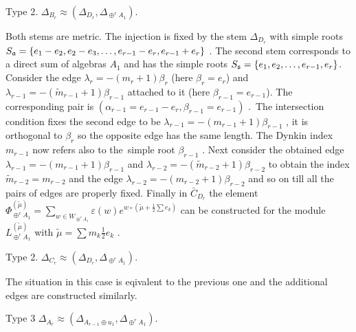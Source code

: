 \documentclass[12pt]{article}
\begin{document}
Type 2. $\Delta _{B_{r}}\approx (\Delta _{D_{r}},\Delta _{\oplus
^{r}A_{1}}). $

Both stems are metric. The injection is fixed by the stem $\Delta
_{D_{r}}$ with simple roots $S_{\frak{a}}=\left\{
e_{1}-e_{2},e_{2}-e_{3},\ldots
,e_{r-1}-e_{r},e_{r-1}+e_{r}\right\} $ . The second stem
corresponds to a
direct sum of algebras $A_{1}$ and has the simple roots $S_{\frak{s}%
}=\left\{ e_{1},e_{2},\ldots ,e_{r-1},e_{r}\right\} $. Consider the edge $%
\lambda _{r}=-\left( m_{r}+1\right) \beta _{r}$ (here $\beta
_{r}=e_{r}$) and $\lambda _{r-1}=-\left(
\widetilde{m}_{r-1}+1\right) \beta _{r-1}$
attached to it (here $\beta _{r-1}=e_{r-1}$). The corresponding pair is $%
\left( \alpha _{r-1}=e_{r-1}-e_{r},\beta _{r-1}=e_{r-1}\right) $
.\ The intersection condition fixes the second edge to be $\lambda
_{r-1}=-\left( m_{r-1}+1\right) \beta _{r-1}$ , it is orthogonal
to $\beta _{r}$ so the opposite edge has the same length. The
Dynkin index $m_{r-1}$ now refers
also to the\ simple root $\beta _{r-1}$ . Next consider the obtained edge $%
\lambda _{r-1}=-\left( m_{r-1}+1\right) \beta _{r-1}$ and $\lambda
_{r-2}=-\left( \widetilde{m}_{r-2}+1\right) \beta _{r-2}$ to
obtain the index $\widetilde{m}_{r-2}=m_{r-2}$ and the edge
$\lambda _{r-2}=-\left( m_{r-2}+1\right) \beta _{r-2}$ and so on
till all the pairs of edges are properly fixed. Finally in
$\bar{C}_{D_{r}}$ the element $\Phi _{\oplus ^{r}A_{1}}^{\left(
\widetilde{\mu }\right) }=\sum_{w\in W_{\oplus
^{r}A_{1}}}\varepsilon \left( w\right) e^{w\circ \left( \widetilde{\mu }+%
\frac{1}{2}\sum e_{k}\right) }$ can be constructed for the module
$L_{\oplus ^{r}A_{1}}^{\left( \widetilde{\mu }\right) }$ with
$\widetilde{\mu }=\sum m_{k}\frac{1}{2}e_{k}$ .

Type 2. $\Delta _{C_{r}}\approx (\Delta _{D_{r}},\Delta _{\oplus
^{r}A_{1}}). $

The situation in this case is eqivalent to the previous one and
the additional edges are constructed similarly.

Type 3 $\Delta _{A_{r}}\approx (\Delta _{A_{r-1}\oplus
u_{1}},\Delta _{\oplus ^{r}A_{1}}).$
\end{document}
